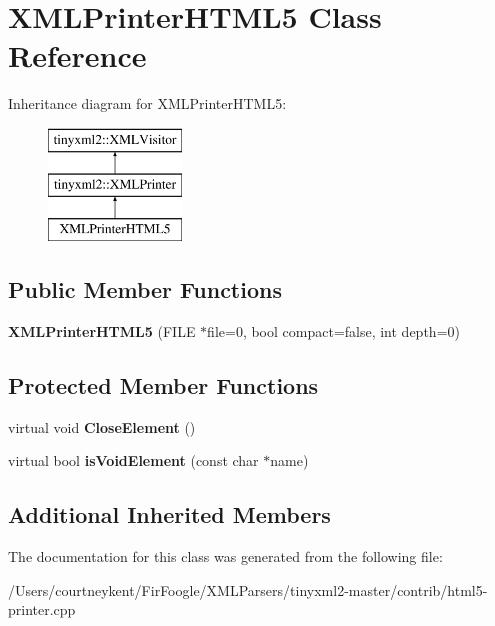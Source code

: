 \hypertarget{class_x_m_l_printer_h_t_m_l5}{\section{X\+M\+L\+Printer\+H\+T\+M\+L5 Class Reference}
\label{class_x_m_l_printer_h_t_m_l5}
}
Inheritance diagram for X\+M\+L\+Printer\+H\+T\+M\+L5\+:\begin{figure}[H]
\begin{center}
\leavevmode
\includegraphics[height=3.000000cm]{class_x_m_l_printer_h_t_m_l5}
\end{center}
\end{figure}
\subsection*{Public Member Functions}
\begin{DoxyCompactItemize}
\item 
\hypertarget{class_x_m_l_printer_h_t_m_l5_af9799bf2b32e719bdf65f99b3e447dbf}{{\bfseries X\+M\+L\+Printer\+H\+T\+M\+L5} (F\+I\+L\+E $\ast$file=0, bool compact=false, int depth=0)}\label{class_x_m_l_printer_h_t_m_l5_af9799bf2b32e719bdf65f99b3e447dbf}

\end{DoxyCompactItemize}
\subsection*{Protected Member Functions}
\begin{DoxyCompactItemize}
\item 
\hypertarget{class_x_m_l_printer_h_t_m_l5_ad4fb1a95802016bdd4ca457c483ba042}{virtual void {\bfseries Close\+Element} ()}\label{class_x_m_l_printer_h_t_m_l5_ad4fb1a95802016bdd4ca457c483ba042}

\item 
\hypertarget{class_x_m_l_printer_h_t_m_l5_a58575b4b925b41bf9a1ef6c22f0853c7}{virtual bool {\bfseries is\+Void\+Element} (const char $\ast$name)}\label{class_x_m_l_printer_h_t_m_l5_a58575b4b925b41bf9a1ef6c22f0853c7}

\end{DoxyCompactItemize}
\subsection*{Additional Inherited Members}


The documentation for this class was generated from the following file\+:\begin{DoxyCompactItemize}
\item 
/\+Users/courtneykent/\+Fir\+Foogle/\+X\+M\+L\+Parsers/tinyxml2-\/master/contrib/html5-\/printer.\+cpp\end{DoxyCompactItemize}

